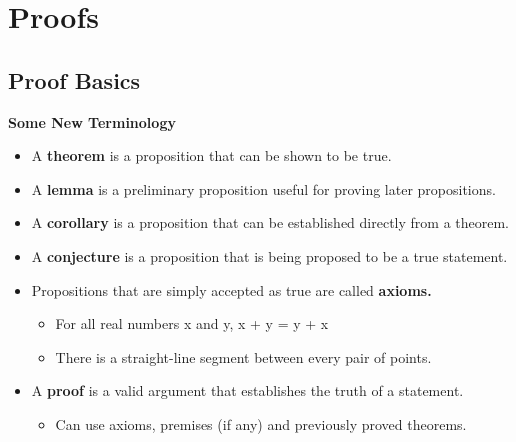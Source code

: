 \documentclass[12pt, letterpaper]{article}
\begin{document}
\pagebreak

\section{Proofs}
\bigbreak
\bigbreak
\subsection{Proof Basics}
\bigbreak
\textbf{Some New Terminology}
\begin{itemize}[leftmargin=0.5cm, label={\faAngleRight}]
	\item A \textbf{theorem} is a proposition that can be shown to be true.
	\item A \textbf{lemma} is a preliminary proposition useful for proving later propositions.
	\item A \textbf{corollary} is a proposition that can be established directly from a theorem.
	\item A \textbf{conjecture} is a proposition that is being proposed to be a true statement.
	\item Propositions that are simply accepted as true are called \textbf{axioms.}
	\begin{itemize}[label={\tiny ex:}]
		\item For all real numbers x and y, x + y = y + x 
		\item There is a straight-line segment between every pair of points.
	\end{itemize}
	\item A \textbf{proof} is a valid argument that establishes the truth of a statement.
	\begin{itemize}[leftmargin=*, label={}]
		\item \vspace*{-0.5cm} {\tiny Can use axioms, premises (if any) and previously proved theorems.}
	\end{itemize}
\end{itemize}
\end{document}
